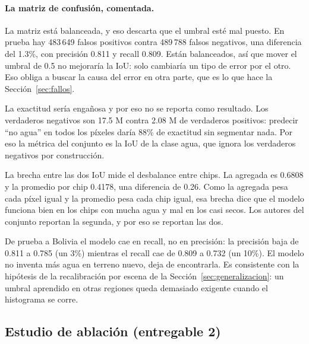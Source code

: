 \documentclass{article}
\begin{document}
\paragraph{La matriz de confusión, comentada.}
La matriz está balanceada, y eso descarta que el umbral esté mal puesto. En
prueba hay 483\,649 falsos positivos contra 489\,788 falsos negativos, una
diferencia del 1.3\%, con precisión 0.811 y recall 0.809. Están balanceados, así
que mover el umbral de 0.5 no mejoraría la IoU: solo cambiaría un tipo de error
por el otro.
Eso obliga a buscar la causa del error en otra parte, que es lo que hace la
Sección~\ref{sec:fallos}.

La exactitud sería engañosa y por eso no se reporta como resultado. Los
verdaderos negativos son 17.5 M contra 2.08 M de verdaderos positivos: predecir
``no agua'' en todos los píxeles daría 88\% de exactitud sin segmentar nada. Por
eso la métrica del conjunto es la IoU de la clase agua, que ignora
los verdaderos negativos por construcción.

La brecha entre las dos IoU mide el desbalance entre chips. La
agregada es 0.6808 y la promedio por chip 0.4178, una diferencia de 0.26. Como la
agregada pesa cada píxel igual y la promedio pesa cada chip igual, esa brecha
dice que el modelo funciona bien en los chips con mucha agua y mal en los
casi secos. Los autores del
conjunto reportan la segunda, y por eso se reportan las dos.

De prueba a Bolivia el modelo cae en recall, no en precisión: la precisión
baja de 0.811 a 0.785 (un 3\%) mientras el recall cae de 0.809 a 0.732 (un 10\%).
El modelo no inventa más agua en terreno nuevo, deja de encontrarla. Es
consistente con la hipótesis de la recalibración por escena de la
Sección~\ref{sec:generalizacion}: un umbral aprendido en otras regiones queda
demasiado exigente cuando el histograma se corre.

\subsection{Estudio de ablación (entregable 2)}
\label{sec:ablacion}
\end{document}
